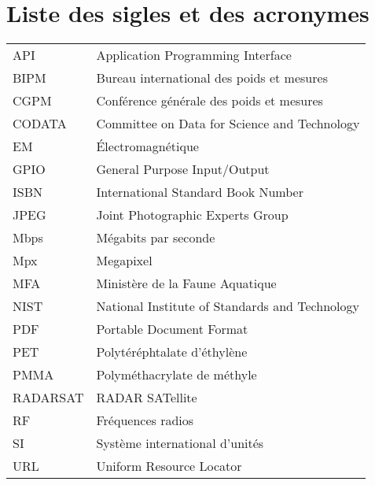 
%
%

\chapter{Liste des sigles et des acronymes}


\begin{flushleft}
   \begin{tabular}{@{}ll}
      API & Application Programming Interface \\
      BIPM & Bureau international des poids et mesures\\
      CGPM & Conférence générale des poids et mesures\\
      CODATA & Committee on Data for Science and Technology\\
      EM & Électromagnétique\\
      GPIO & General Purpose Input/Output \\
      ISBN & International Standard Book Number\\
      JPEG & Joint Photographic Experts Group\\
      Mbps & Mégabits par seconde \\
      Mpx & Megapixel \\
      MFA & Ministère de la Faune Aquatique \\
      NIST & National Institute of Standards and Technology \\
      PDF & Portable Document Format \\
      PET & Polytéréphtalate d'éthylène \\
      PMMA & Polyméthacrylate de méthyle \\
      RADARSAT & RADAR SATellite\\
      RF & Fréquences radios\\
      SI & Système international d'unités \\
      URL & Uniform Resource Locator \\
   \end{tabular}
\end{flushleft}






